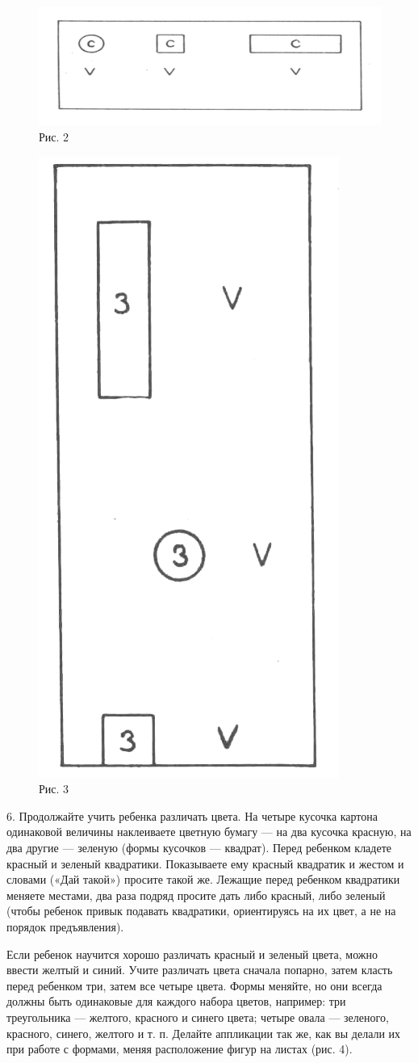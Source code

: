 \documentclass{book}
\begin{document}
\begin{figure}
\centering
\includegraphics[width=0.6\linewidth]{media/media/image2.png}
\caption*{Рис. 2}
\end{figure}

\begin{figure}
\centering
\includegraphics[width=0.25\linewidth]{media/media/image3.jpg}
\caption*{Рис. 3}
\end{figure}

6. Продолжайте учить ребенка различать цвета. На четыре кусочка картона
одинаковой величины наклеиваете цветную бумагу --- на два кусочка
красную, на два другие --- зеленую (формы кусочков --- квадрат). Перед
ребенком кладете красный и зеленый квадратики. Показываете ему красный
квадратик и жестом и словами («Дай такой») просите такой же. Лежащие
перед ребенком квадратики меняете местами, два раза подряд просите дать
либо красный, либо зеленый (чтобы ребенок привык подавать квадратики,
ориентируясь на их цвет, а не на порядок предъявления).

Если ребенок научится хорошо различать красный и зеленый цвета, можно
ввести желтый и синий. Учите различать цвета сначала попарно, затем
класть перед ребенком три, затем все четыре цвета. Формы меняйте, но они
всегда должны быть одинаковые для каждого набора цветов, например: три
треугольника --- желтого, красного и синего цвета; четыре овала ---
зеленого, красного, синего, желтого и т. п. Делайте аппликации так же,
как вы делали их при работе с формами, меняя расположение фигур на
листах (рис. 4).
\end{document}
